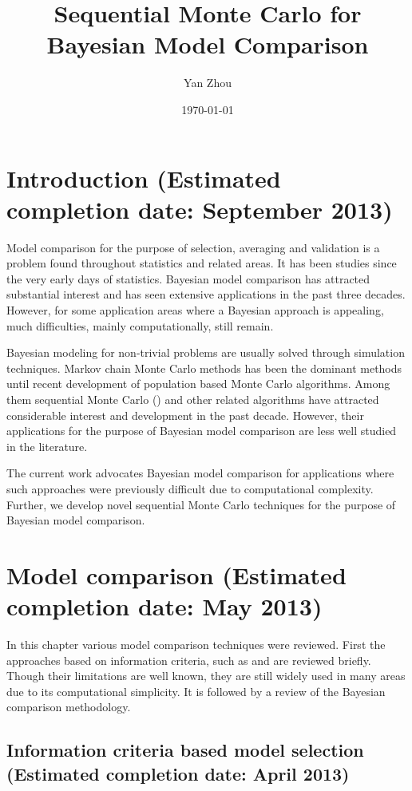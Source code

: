 \documentclass[11pt, fontset = Minion]{marticle}
\title{Sequential Monte Carlo for Bayesian Model Comparison}
\author{Yan Zhou}
\date{\today}
\def\finish#1{(Estimated completion date: #1 2013)}
\begin{document}
\maketitle

\section{Introduction \finish{September}}

Model comparison for the purpose of selection, averaging and validation is a
problem found throughout statistics and related areas. It has been studies
since the very early days of statistics. Bayesian model comparison has
attracted substantial interest and has seen extensive applications in the past
three decades. However, for some application areas where a Bayesian approach
is appealing, much difficulties, mainly computationally, still remain.

Bayesian modeling for non-trivial problems are usually solved through
simulation techniques. Markov chain Monte Carlo methods has been the dominant
methods until recent development of population based Monte Carlo algorithms.
Among them sequential Monte Carlo (\smc) and other related algorithms have
attracted considerable interest and development in the past decade. However,
their applications for the purpose of Bayesian model comparison are less well
studied in the literature.

The current work advocates Bayesian model comparison for applications where
such approaches were previously difficult due to computational complexity.
Further, we develop novel sequential Monte Carlo techniques for the purpose of
Bayesian model comparison.

\section{Model comparison \finish{May}}

In this chapter various model comparison techniques were reviewed. First the
approaches based on information criteria, such as \aic and \bic are reviewed
briefly. Though their limitations are well known, they are still widely used
in many areas due to its computational simplicity. It is followed by a review
of the Bayesian comparison methodology.

\subsection{Information criteria based model selection \finish{April}}
\end{document}
